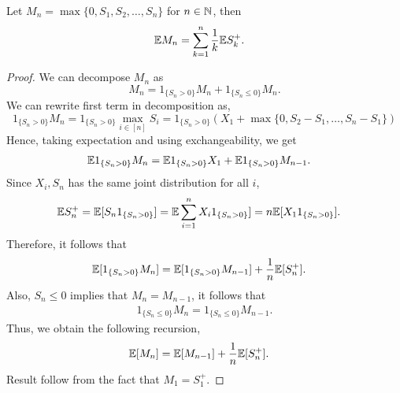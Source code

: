 \documentclass[a4paper,10pt,english]{article}
\begin{document}
\begin{prop} Let $M_n=\max\{0,S_1,S_2, \ldots, S_n\}$ for $n \in \mathbb{N}$, then %
\begin{align*}
\mathbb{E} M_n &= \sum_{k=1}^{n} \frac{1}{k} \mathbb{E} S_k^+.
\end{align*}
\end{prop}
\begin{proof}
We can decompose $M_n$ as 
\begin{equation*}
M_n=1_{\{S_n>0\}}M_n+1_{\{S_n \leq 0\}}M_n.
\end{equation*}
We can rewrite first term in decomposition as, 
\begin{equation*}
1_{\{S_n>0\}}M_n= 1_{\{S_n>0\}}\max_{i \in [n]}S_i = 1_{\{S_n>0\}}(X_1+\max\{0,S_2 - S_1,\ldots, S_n - S_1\})
\end{equation*}
Hence, taking expectation and using exchangeability, we get 
\begin{align*}
\E1_{\{S_n>0\}}M_n &= %
\E 1_{\{S_n>0\}} X_1 + \E1_{\{S_n>0\}}M_{n-1} .
\end{align*}
Since $X_i,S_n$ has the same joint distribution for all $i$,
\begin{align*}
\mathbb{E} S_n^+ &= \mathbb{E}[S_n1_{\{S_n>0\}}]=\mathbb{E}\sum_{i=1}^{n}X_i 1_{\{S_n>0\}}]=n\mathbb{E}[X_11_{\{S_n>0\}}].
\end{align*}
Therefore, it follows that
\begin{align*}
\mathbb{E}[1_{\{S_n>0\}}M_n] &=\mathbb{E}[1_{\{S_n>0\}}M_{n-1}]+\frac{1}{n}\mathbb{E}[S_n^+].
\end{align*}
Also, $S_n \leq 0$ implies that $M_n=M_{n-1}$, it follows that
\begin{align*}
1_{\{S_n\leq 0\}}M_n=1_{\{S_n\leq 0\}}M_{n-1}.
\end{align*}
Thus, we obtain the following recursion,
\begin{align*}
\mathbb{E}[M_n]&=\mathbb{E}[M_{n-1}]+\frac{1}{n}\mathbb{E}[S_n^+].
\end{align*}
Result follow from the fact that $M_1 =S_1^+$.
\end{proof}
\end{document}
